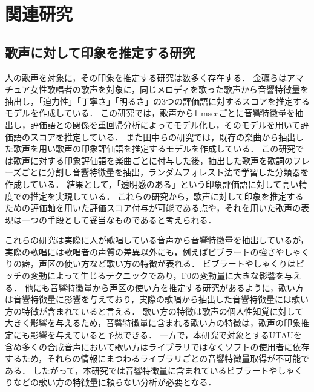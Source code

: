 \thispagestyle{myheadings}
\chapter{関連研究}
\label{sec:format}

\section{歌声に対して印象を推定する研究}
人の歌声を対象に，その印象を推定する研究は数多く存在する．
金礪らはアマチュア女性歌唱者の歌声を対象に，同じメロディを歌った歌声から音響特徴量を抽出し，「迫力性」「丁寧さ」「明るさ」の3つの評価語に対するスコアを推定するモデルを作成している\cite{impression}．
この研究では，歌声から1 msecごとに音響特徴量を抽出し，評価語との関係を重回帰分析によってモデル化し，そのモデルを用いて評価語のスコアを推定している．
また田中らの研究\cite{rnd_forest}では，既存の楽曲から抽出した歌声を用い歌声の印象評価語を推定するモデルを作成している．
この研究では歌声に対する印象評価語を楽曲ごとに付与した後，抽出した歌声を歌詞のフレーズごとに分割し音響特徴量を抽出，ランダムフォレスト法で学習した分類器を作成している．
結果として，「透明感のある」という印象評価語に対して高い精度での推定を実現している．
これらの研究から，歌声に対して印象を推定するための評価軸を用いた評価スコア付与が可能である点や，それを用いた歌声の表現は一つの手段として妥当なものであると考えられる．

これらの研究は実際に人が歌唱している音声から音響特徴量を抽出しているが，実際の歌唱には歌唱者の声質の差異以外にも，例えばビブラートの強さやしゃくりの癖，声区の使い方など歌い方の特徴が表れる．
ビブラートやしゃくりはピッチの変動によって生じるテクニックであり，F0の変動量に大きな影響を与える．
他にも音響特徴量から声区の使い方を推定する研究\cite{pop_seiku}があるように，歌い方は音響特徴量に影響を与えており，実際の歌唱から抽出した音響特徴量には歌い方の特徴が含まれていると言える．
歌い方の特徴は歌声の個人性知覚に対して大きく影響を与える\cite{vibrato_monomane}\cite{monomane_tec}ため，音響特徴量に含まれる歌い方の特徴は，歌声の印象推定にも影響を与えていると予想できる．
一方で，本研究で対象とするUTAUを含め多くの合成音声において歌い方はライブラリではなくソフトの使用者に依存するため，それらの情報にまつわるライブラリごとの音響特徴量取得が不可能である．
したがって，本研究では音響特徴量に含まれているビブラートやしゃくりなどの歌い方の特徴量に頼らない分析が必要となる．

